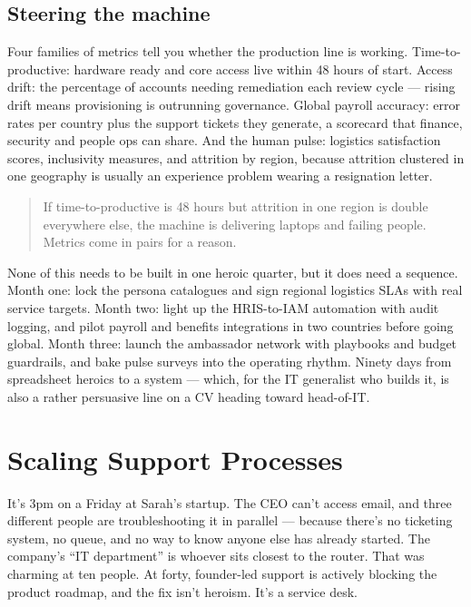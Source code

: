 \subsection{Steering the machine}


Four families of metrics tell you whether the production line is working. Time-to-productive: hardware ready and core access live within 48 hours of start. Access drift: the percentage of accounts needing remediation each review cycle — rising drift means provisioning is outrunning governance. Global payroll accuracy: error rates per country plus the support tickets they generate, a scorecard that finance, security and people ops can share. And the human pulse: logistics satisfaction scores, inclusivity measures, and attrition by region, because attrition clustered in one geography is usually an experience problem wearing a resignation letter.



\begin{quote}\small
If time-to-productive is 48 hours but attrition in one region is double everywhere else, the machine is delivering laptops and failing people. Metrics come in pairs for a reason.
\end{quote}


None of this needs to be built in one heroic quarter, but it does need a sequence. Month one: lock the persona catalogues and sign regional logistics SLAs with real service targets. Month two: light up the HRIS-to-IAM automation with audit logging, and pilot payroll and benefits integrations in two countries before going global. Month three: launch the ambassador network with playbooks and budget guardrails, and bake pulse surveys into the operating rhythm. Ninety days from spreadsheet heroics to a system — which, for the IT generalist who builds it, is also a rather persuasive line on a CV heading toward head-of-IT.

\section{Scaling Support Processes}
It's 3pm on a Friday at Sarah's startup. The CEO can't access email, and three different people are troubleshooting it in parallel — because there's no ticketing system, no queue, and no way to know anyone else has already started. The company's ``IT department'' is whoever sits closest to the router. That was charming at ten people. At forty, founder-led support is actively blocking the product roadmap, and the fix isn't heroism. It's a service desk.


